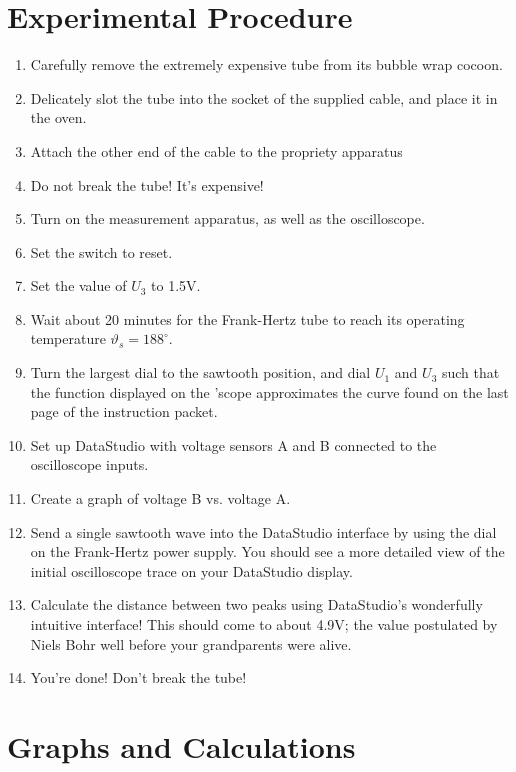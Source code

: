 \documentclass{amsart}
\begin{document}
\section{Experimental Procedure}
\begin{enumerate}
\item Carefully remove the extremely expensive tube from its bubble wrap cocoon.
\item Delicately slot the tube into the socket of the supplied cable, and place it in the oven.
\item Attach the other end of the cable to the propriety apparatus
\item Do not break the tube! It's expensive!
\item Turn on the measurement apparatus, as well as the oscilloscope.
\item Set the switch to reset.
\item Set the value of $U_3$ to 1.5V.
\item Wait about 20 minutes for the Frank-Hertz tube to reach its operating temperature $\vartheta_s = 188^{\circ}$.
\item Turn the largest dial to the sawtooth position, and dial $U_1$ and $U_3$ such that the function displayed on the 'scope approximates the curve found on the last page of the instruction packet.
\item Set up DataStudio with voltage sensors A and B connected to the oscilloscope inputs.
\item Create a graph of voltage B vs. voltage A.
\item Send a single sawtooth wave into the DataStudio interface by using the dial on the Frank-Hertz power supply. You should see a more detailed view of the initial oscilloscope trace on your DataStudio display.
\item Calculate the distance between two peaks using DataStudio's wonderfully intuitive interface! This should come to about 4.9V; the value postulated by Niels Bohr well before your grandparents were alive.
\item You're done! Don't break the tube!
\end{enumerate}

\section{Graphs and Calculations}
\end{document}
